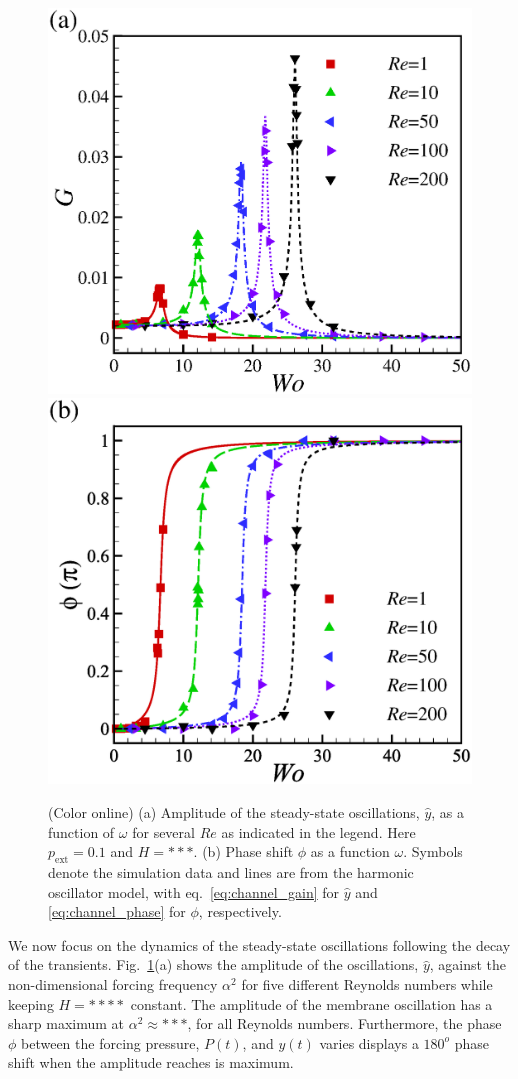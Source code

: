 \documentclass[aps,prl,reprint,superscriptaddress,floatfix]{revtex4-1}
\begin{document}
\begin{figure}
\centering
\includegraphics[width=0.49\linewidth, trim={0.3cm 0cm 1.75cm 1cm}, clip]{./epsFig/fig3a.eps}	
\includegraphics[width=0.49\linewidth, trim={0.3cm 0cm 1.75cm 1cm}, clip]{./epsFig/fig3b.eps}
\caption{\label{fig:amplitude_phase}(Color online) (a) Amplitude of
  the steady-state oscillations, $\widehat{y}$, as a function of
  $\omega$ for several $Re$ as indicated in the legend.
  Here $p_\text{ext}=0.1$ and $H=***$. (b) Phase shift $\phi$ as a
  function $\omega$. Symbols denote the simulation data and lines are
  from the harmonic oscillator model, with eq.~\eqref{eq:channel_gain}
  for $\widehat{y}$ and \eqref{eq:channel_phase} for $\phi$, respectively.}
\end{figure}

We now focus on the dynamics of the steady-state oscillations following
the decay of the transients. Fig.~\ref{fig:amplitude_phase}(a) shows the
amplitude of the oscillations, $\widehat{y}$, against the
non-dimensional forcing frequency $\alpha^2$ for five different
Reynolds numbers while keeping $H = ****$ constant.
The amplitude of the membrane oscillation has a sharp maximum at
$\alpha^2 \approx ***$, for all Reynolds numbers. Furthermore,
the phase $\phi$ between the forcing pressure, $P(t)$, and $y(t)$ varies
displays a $180^{o}$ phase shift when the amplitude reaches is maximum.
\end{document}
